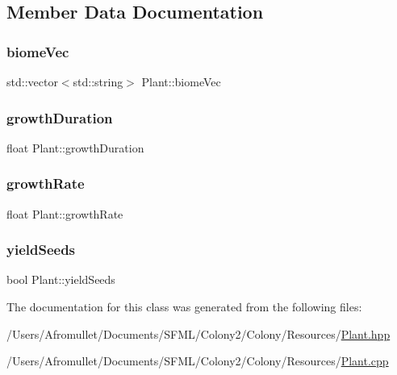 \subsection{Member Data Documentation}
\mbox{\label{class_plant_a452989226b807a8ef885fc810a1e7f17}} 
\subsubsection{\texorpdfstring{biome\+Vec}{biomeVec}}
{\footnotesize\ttfamily std\+::vector$<$std\+::string$>$ Plant\+::biome\+Vec\hspace{0.3cm}{\ttfamily [private]}}

\mbox{\label{class_plant_aa17e87fd95a8d188c3ad4fe12d68befa}} 
\subsubsection{\texorpdfstring{growth\+Duration}{growthDuration}}
{\footnotesize\ttfamily float Plant\+::growth\+Duration\hspace{0.3cm}{\ttfamily [private]}}

\mbox{\label{class_plant_a3e0a3a4109fe0ce37eb56576cb06c2aa}} 
\subsubsection{\texorpdfstring{growth\+Rate}{growthRate}}
{\footnotesize\ttfamily float Plant\+::growth\+Rate\hspace{0.3cm}{\ttfamily [private]}}

\mbox{\label{class_plant_ab4d4894c58e27f62622b1a9388538b96}} 
\subsubsection{\texorpdfstring{yield\+Seeds}{yieldSeeds}}
{\footnotesize\ttfamily bool Plant\+::yield\+Seeds\hspace{0.3cm}{\ttfamily [private]}}



The documentation for this class was generated from the following files\+:\begin{DoxyCompactItemize}
\item 
/\+Users/\+Afromullet/\+Documents/\+S\+F\+M\+L/\+Colony2/\+Colony/\+Resources/\mbox{\hyperlink{_plant_8hpp}{Plant.\+hpp}}\item 
/\+Users/\+Afromullet/\+Documents/\+S\+F\+M\+L/\+Colony2/\+Colony/\+Resources/\mbox{\hyperlink{_plant_8cpp}{Plant.\+cpp}}\end{DoxyCompactItemize}
